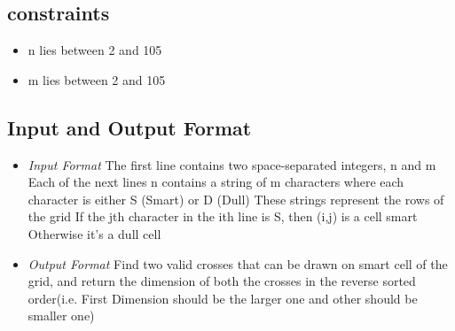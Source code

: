 \documentclass[10pt]{article}
\begin{document}
\newpage


\subsection{constraints}
\begin{itemize}
	\item n lies between 2 and 105
	\item m lies between 2 and 105
\end{itemize}

\subsection{Input and Output Format}
\begin{itemize}
		\item \textit{Input Format}
		\subitem The first line contains two space-separated integers,  n and m
		\subitem Each of the next  lines n contains a string of  m characters where each character is either S (Smart) or D (Dull)		
		\subitem These strings represent the rows of the grid
		\subitem If the jth character in the ith  line is S, then  (i,j) is a  cell smart
		\subitem Otherwise it's a  dull cell
		\item \textit{Output Format}
		\subitem \cite{2}
		\subitem Find two valid crosses that can be drawn on smart cell of the grid, and return the dimension of both the crosses in the reverse sorted order(i.e. First Dimension should be the larger one and other should be smaller one)
\end{itemize}
\end{document}

